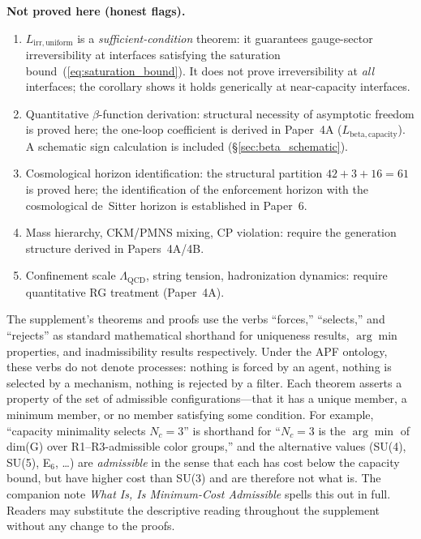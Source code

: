 \documentclass[11pt,a4paper]{article}
\theoremstyle{definition}
\begin{document}
\begin{tcolorbox}[apfbox, title={What Is Assumed, What Is Proved, What Is Deferred}]
\smallskip\noindent\textbf{Not proved here (honest flags).}
\begin{enumerate}[nosep,label=\arabic*.,leftmargin=2em]
  \item $L_{\mathrm{irr,uniform}}$ is a \emph{sufficient-condition} theorem: it guarantees gauge-sector irreversibility at interfaces satisfying the saturation bound~(\ref{eq:saturation_bound}).  It does not prove irreversibility at \emph{all} interfaces; the corollary shows it holds generically at near-capacity interfaces.
  \item Quantitative $\beta$-function derivation: structural necessity of asymptotic freedom is proved here; the one-loop coefficient is derived in Paper~4A ($L_{\mathrm{beta,capacity}}$).  A schematic sign calculation is included (\S\ref{sec:beta_schematic}).
  \item Cosmological horizon identification: the structural partition $42+3+16=61$ is proved here; the identification of the enforcement horizon with the cosmological de~Sitter horizon is established in Paper~6.
  \item Mass hierarchy, CKM/PMNS mixing, CP violation: require the generation structure derived in Papers~4A/4B.
  \item Confinement scale $\Lambda_{\mathrm{QCD}}$, string tension, hadronization dynamics: require quantitative RG treatment (Paper~4A).
\end{enumerate}
\end{tcolorbox}

\medskip
\begin{tcolorbox}[apfbox, title={Framing convention: ``forces'' and ``selects'' denote uniqueness, not processes}]
\footnotesize
The supplement's theorems and proofs use the verbs ``forces,'' ``selects,'' and ``rejects'' as standard mathematical shorthand for uniqueness results, $\arg\min$ properties, and inadmissibility results respectively.  Under the APF ontology, these verbs do not denote processes: nothing is forced by an agent, nothing is selected by a mechanism, nothing is rejected by a filter.  Each theorem asserts a property of the set of admissible configurations---that it has a unique member, a minimum member, or no member satisfying some condition.  For example, ``capacity minimality selects $N_c = 3$'' is shorthand for ``$N_c = 3$ is the $\arg\min$ of dim(G) over R1--R3-admissible color groups,'' and the alternative values (SU(4), SU(5), E$_6$, \ldots) are \emph{admissible} in the sense that each has cost below the capacity bound, but have higher cost than SU(3) and are therefore not what is.  The companion note \emph{What Is, Is Minimum-Cost Admissible} spells this out in full.  Readers may substitute the descriptive reading throughout the supplement without any change to the proofs.
\end{tcolorbox}
\end{document}
